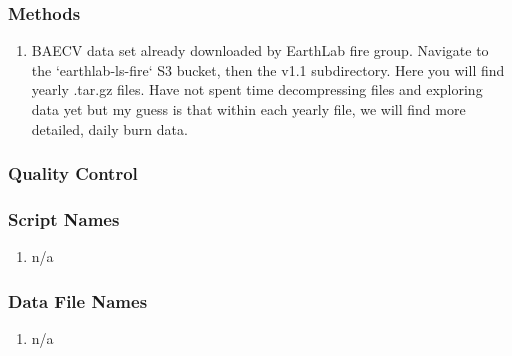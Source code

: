 \subsubsection*{Methods}
\begin{enumerate}
\item BAECV data set already downloaded by EarthLab fire group. Navigate to the `earthlab-ls-fire` S3 bucket, then the v1.1 subdirectory. Here you will find yearly .tar.gz files. Have not spent time decompressing files and exploring data yet but my guess is that within each yearly file, we will find more detailed, daily burn data.
\end{enumerate}
\subsubsection*{Quality Control}
\subsubsection*{Script Names}
\begin{enumerate}
\item n/a
\end{enumerate}
\subsubsection*{Data File Names}
\begin{enumerate}
\item n/a
\end{enumerate}